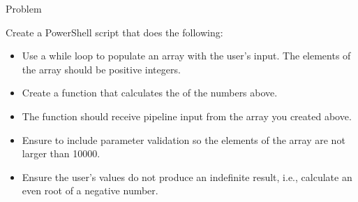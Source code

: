 \begin{step}[colframe=odgreen]{Problem}

    Create a PowerShell script that does the following:

    \begin{itemize}
    
        \item Use a while loop to populate an array with the user's input. The elements of the array should be positive integers.

        \item Create a function that calculates the \href{https://en.wikipedia.org/wiki/Geometric_mean}{}  of the numbers above.

        \item The function should receive pipeline input from the array you created above. 

        \item Ensure to include parameter validation so the elements of the array are not larger than 10000.

        \item Ensure the user's values do not produce an indefinite result, i.e., calculate an even root of a negative number.
        
    \end{itemize}

\end{step}

